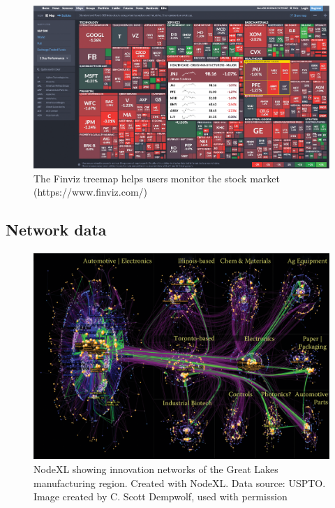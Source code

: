 \documentclass[]{krantz}
\begin{document}
\begin{figure}

{\centering \includegraphics[width=0.9\linewidth]{ChapterViz/figures/fig9-9} 

}

\caption{The Finviz treemap helps users monitor the stock market (https://www.finviz.com/)}\label{fig:fig9-9}
\end{figure}

\subsection{Network data}\label{sec:viz-2.6}

\begin{figure}

{\centering \includegraphics[width=0.9\linewidth]{ChapterViz/figures/fig9-10} 

}

\caption{NodeXL showing innovation networks of the Great Lakes manufacturing region. Created with NodeXL. Data source: USPTO. Image created by C. Scott Dempwolf, used with permission}\label{fig:fig9-10}
\end{figure}
\end{document}
